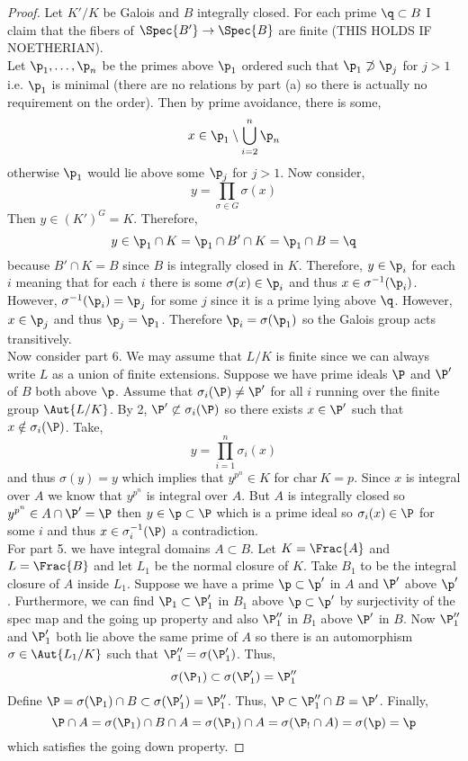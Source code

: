 \documentclass[12pt]{article}
\begin{document}
\begin{proof}
Let $K'/K$ be Galois and $B$ integrally closed. For each prime $\q \subset B$ I claim that the fibers of $\Spec{B'} \to \Spec{B}$ are finite (THIS HOLDS IF NOETHERIAN).
\bigskip\\
Let $\p_1, \dots, \p_n$ be the primes above $\p_1$ ordered such that $\p_1 \not\supset \p_j$ for $j > 1$ i.e. $\p_1$ is minimal (there are no relations by part (a) so there is actually no requirement on the order). Then by prime avoidance, there is some,
\[ x \in \p_1 \setminus \bigcup_{i = 2}^n \p_n \]
otherwise $\p_1$ would lie above some $\p_j$ for $j > 1$.
Now consider,
\[ y = \prod_{\sigma \in G} \sigma(x) \]
Then $y \in (K')^G = K$. Therefore,
\[ y \in \p_1 \cap K = \p_1 \cap B' \cap K = \p_1 \cap B = \q \]
because $B' \cap K = B$ since $B$ is integrally closed in $K$. Therefore, $y \in \p_i$ for each $i$ meaning that for each $i$ there is some $\sigma(x) \in \p_i$ and thus $x \in \sigma^{-1}(\p_i)$. However, $\sigma^{-1}(\p_i) = \p_j$ for some $j$ since it is a prime lying above $\q$. However, $x \in \p_j$ and thus $\p_j = \p_1$. Therefore $\p_i = \sigma(\p_1)$ so the Galois group acts transitively.
\bigskip\\
Now consider part 6. We may assume that $L / K$ is finite since we can always write $L$ as a union of finite extensions. Suppose we have prime ideals $\P$ and $\P'$ of $B$ both above $\p$. Assume that $\sigma_i(\P) \neq \P'$ for all $i$ running over the finite group $\Aut{L/K}$. By 2, $\P' \not\subset \sigma_i(\P)$ so there exists $x \in \P'$ such that $x \notin \sigma_i(\P)$. Take,
\[ y = \prod_{i = 1}^n \sigma_i(x) \]
and thus $\sigma(y) = y$ which implies that $y^{p^n} \in K$ for $\mathrm{char} \: K = p$. Since $x$ is integral over $A$ we know that $y^{p^n}$ is integral over $A$. But $A$ is integrally closed so $y^{p^n} \in A \cap \P' = \P$ then $y \in \p \subset \P$ which is a prime ideal so $\sigma_i(x) \in \P$ for some $i$ and thus $x \in \sigma_i^{-1}(\P)$ a contradiction. 
\bigskip\\
For part 5. we have integral domains $A \subset B$. Let $K = \Frac{A}$ and $L = \Frac{B}$ and let $L_1$ be the normal closure of $K$. Take $B_1$ to be the integral closure of $A$ inside $L_1$. Suppose we have a prime $\p \subset \p'$ in $A$ and $\P'$ above $\p'$. Furthermore, we can find $\P_1 \subset \P_1'$ in $B_1$ above $\p \subset \p'$ by surjectivity of the spec map and the going up property and also $\P_1''$ in $B_1$ above $\P'$ in $B$. Now $\P_1''$ and $\P_1'$ both lie above the same prime of $A$ so there is an automorphism $\sigma \in \Aut{L_1 / K}$ such that $\P_1'' = \sigma(\P_1')$. Thus,
\[ \sigma(\P_1) \subset \sigma(\P_1') = \P_1'' \]
Define $\P = \sigma(\P_1) \cap B \subset \sigma(\P_1') = \P_1''$. Thus, $\P \subset \P_1'' \cap B = \P'$. Finally,
\[ \P \cap A = \sigma(\P_1) \cap B \cap A = \sigma(\P_1) \cap A = \sigma(\P_! \cap A) = \sigma(\p) = \p \]
which satisfies the going down property.    

\end{proof}
\end{document}
